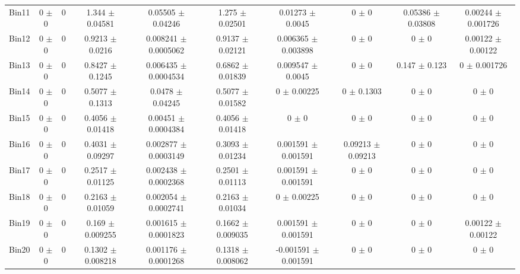 \begin{tabular}{@{\extracolsep{4pt}}lccccccccc@{}}
     Bin11 & 0 $\pm$ 0 & 0 & 1.344 $\pm$ 0.04581 & 0.05505 $\pm$ 0.04246 & 1.275 $\pm$ 0.02501 & 0.01273 $\pm$ 0.0045 & 0 $\pm$ 0 & 0.05386 $\pm$ 0.03808 & 0.00244 $\pm$ 0.001726 \\ 
     Bin12 & 0 $\pm$ 0 & 0 & 0.9213 $\pm$ 0.0216 & 0.008241 $\pm$ 0.0005062 & 0.9137 $\pm$ 0.02121 & 0.006365 $\pm$ 0.003898 & 0 $\pm$ 0 & 0 $\pm$ 0 & 0.00122 $\pm$ 0.00122 \\ 
     Bin13 & 0 $\pm$ 0 & 0 & 0.8427 $\pm$ 0.1245 & 0.006435 $\pm$ 0.0004534 & 0.6862 $\pm$ 0.01839 & 0.009547 $\pm$ 0.0045 & 0 $\pm$ 0 & 0.147 $\pm$ 0.123 & 0 $\pm$ 0.001726 \\ 
     Bin14 & 0 $\pm$ 0 & 0 & 0.5077 $\pm$ 0.1313 & 0.0478 $\pm$ 0.04245 & 0.5077 $\pm$ 0.01582 & 0 $\pm$ 0.00225 & 0 $\pm$ 0.1303 & 0 $\pm$ 0 & 0 $\pm$ 0 \\ 
     Bin15 & 0 $\pm$ 0 & 0 & 0.4056 $\pm$ 0.01418 & 0.00451 $\pm$ 0.0004384 & 0.4056 $\pm$ 0.01418 & 0 $\pm$ 0 & 0 $\pm$ 0 & 0 $\pm$ 0 & 0 $\pm$ 0 \\ 
     Bin16 & 0 $\pm$ 0 & 0 & 0.4031 $\pm$ 0.09297 & 0.002877 $\pm$ 0.0003149 & 0.3093 $\pm$ 0.01234 & 0.001591 $\pm$ 0.001591 & 0.09213 $\pm$ 0.09213 & 0 $\pm$ 0 & 0 $\pm$ 0 \\ 
     Bin17 & 0 $\pm$ 0 & 0 & 0.2517 $\pm$ 0.01125 & 0.002438 $\pm$ 0.0002368 & 0.2501 $\pm$ 0.01113 & 0.001591 $\pm$ 0.001591 & 0 $\pm$ 0 & 0 $\pm$ 0 & 0 $\pm$ 0 \\ 
     Bin18 & 0 $\pm$ 0 & 0 & 0.2163 $\pm$ 0.01059 & 0.002054 $\pm$ 0.0002741 & 0.2163 $\pm$ 0.01034 & 0 $\pm$ 0.00225 & 0 $\pm$ 0 & 0 $\pm$ 0 & 0 $\pm$ 0 \\ 
     Bin19 & 0 $\pm$ 0 & 0 & 0.169 $\pm$ 0.009255 & 0.001615 $\pm$ 0.0001823 & 0.1662 $\pm$ 0.009035 & 0.001591 $\pm$ 0.001591 & 0 $\pm$ 0 & 0 $\pm$ 0 & 0.00122 $\pm$ 0.00122 \\ 
     Bin20 & 0 $\pm$ 0 & 0 & 0.1302 $\pm$ 0.008218 & 0.001176 $\pm$ 0.0001268 & 0.1318 $\pm$ 0.008062 & -0.001591 $\pm$ 0.001591 & 0 $\pm$ 0 & 0 $\pm$ 0 & 0 $\pm$ 0 \\ 
\hline\hline
  \end{tabular}
